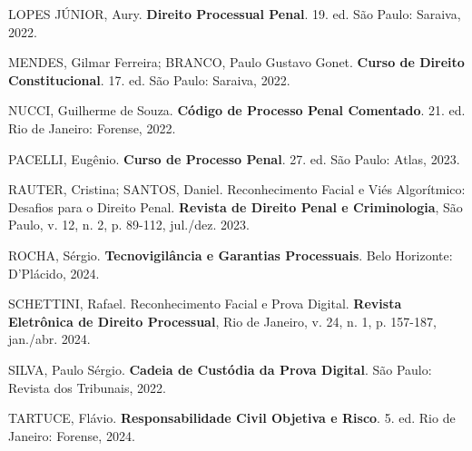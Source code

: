 \documentclass[12pt,a4paper]{article}
\begin{document}
LOPES JÚNIOR, Aury. \textbf{Direito Processual Penal}. 19. ed. São Paulo: Saraiva, 2022.

MENDES, Gilmar Ferreira; BRANCO, Paulo Gustavo Gonet. \textbf{Curso de Direito Constitucional}. 17. ed. São Paulo: Saraiva, 2022.

NUCCI, Guilherme de Souza. \textbf{Código de Processo Penal Comentado}. 21. ed. Rio de Janeiro: Forense, 2022.

PACELLI, Eugênio. \textbf{Curso de Processo Penal}. 27. ed. São Paulo: Atlas, 2023.

RAUTER, Cristina; SANTOS, Daniel. Reconhecimento Facial e Viés Algorítmico: Desafios para o Direito Penal. \textbf{Revista de Direito Penal e Criminologia}, São Paulo, v. 12, n. 2, p. 89-112, jul./dez. 2023.

ROCHA, Sérgio. \textbf{Tecnovigilância e Garantias Processuais}. Belo Horizonte: D'Plácido, 2024.

SCHETTINI, Rafael. Reconhecimento Facial e Prova Digital. \textbf{Revista Eletrônica de Direito Processual}, Rio de Janeiro, v. 24, n. 1, p. 157-187, jan./abr. 2024.

SILVA, Paulo Sérgio. \textbf{Cadeia de Custódia da Prova Digital}. São Paulo: Revista dos Tribunais, 2022.

TARTUCE, Flávio. \textbf{Responsabilidade Civil Objetiva e Risco}. 5. ed. Rio de Janeiro: Forense, 2024.
\end{document}
